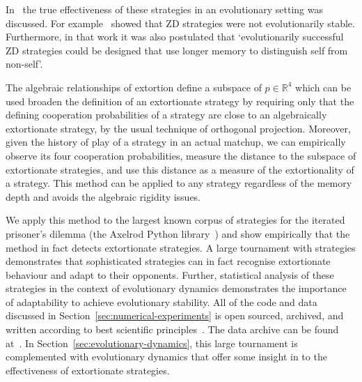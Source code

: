 \documentclass[a4paper]{article}
\begin{document}
In~\cite{adami2013evolutionary, Hilbe2013, hilbe2013adaptive, hilbe2015partners,
ichinose2018zero, Moran1707} the true effectiveness of these strategies in an
evolutionary setting was discussed. For
example~\cite{adami2013evolutionary} showed that ZD strategies were not
evolutionarily stable. Furthermore, in that work it was also postulated that
`evolutionarily successful ZD strategies could be designed that use longer memory
to distinguish self from non-self'.

The algebraic relationships of extortion define a subspace of
\(p\in\mathbb{R}^4\) which can be used broaden the definition of an extortionate
strategy by requiring only that the defining cooperation probabilities of a
strategy are close to an algebraically extortionate strategy, by the usual
technique of orthogonal projection. Moreover, given the history of play of a
strategy in an actual matchup, we can empirically observe its four
cooperation probabilities, measure the distance to the subspace of extortionate
strategies, and use this distance as a measure of the extortionality of a
strategy. This method can be applied to any strategy regardless of the memory
depth and avoids the algebraic rigidity issues.

We apply this method to the largest known corpus of strategies for the iterated
prisoner's dilemma (the Axelrod Python library~\cite{Knight2016, Knight2018})
and show empirically that the method in fact detects extortionate strategies.
A large tournament with 
strategies demonstrates that sophisticated
strategies can in fact recognise extortionate behaviour and adapt to their
opponents. Further, statistical analysis of these strategies in the context of
evolutionary dynamics demonstrates the importance of adaptability to achieve
evolutionary stability. All of the code and data discussed in
Section~\ref{sec:numerical-experiments} is open sourced, archived, and written
according to best scientific principles~\cite{Wilson2014}. The data archive can
be found at~\cite{vincent_knight_2018_1297075}. In
Section~\ref{sec:evolutionary-dynamics}, this large tournament is complemented
with evolutionary dynamics that offer some insight in to the
effectiveness of extortionate strategies.
\end{document}
